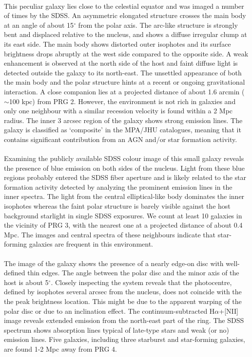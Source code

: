 \documentclass[useAMS,usenatbib]{mn2e}
\begin{document}
 \\
This peculiar galaxy lies close to the celestial equator and was imaged a number of times by the SDSS.
An asymmetric elongated structure crosses the main body at an angle of about 15$^\circ$ from the polar axis.
The arc-like structure is strongly bent and displaced relative to the nucleus, and shows a diffuse irregular clump at its east side.
The main body shows distorted outer isophotes and its surface brightness drops abruptly at the west side compared to the opposite side. 
A weak enhancement is observed at the north side of the host and faint diffuse light is detected outside the galaxy to its north-east.
The unsettled appearance of both the main body and the polar structure hints at a recent or ongoing gravitational interaction.
A close companion lies at a projected distance of about 1.6 arcmin ($\sim$100 kpc) from PRG 2.
However, the environment is not rich in galaxies and only one neighbour with a similar recession velocity is found within a 2 Mpc radius. 
The inner 3 arcsec region of the galaxy shows strong emission lines. 
The galaxy is classified as `composite' in the MPA/JHU catalogues, meaning that it contains significant contribution from an AGN and/or star formation activity.\\

 \\ 
Examining the publicly available SDSS colour image of this small galaxy reveals the presence of blue emission on both sides of the nucleus.
Light from these blue regions probably entered the SDSS fiber aperture and is likely related to the star formation activity detected by analyzing the prominent emission lines in the inner spectra.
The light from the central elliptical-like body dominates the inner isophotes whereas the faint polar structure is barely visible against the host  background starlight in single SDSS exposures.
We count at least 10 galaxies in the vicinity of PRG 3, with the nearest one at a projected distance of about 0.4 Mpc.
The images and central spectra of these neighbours indicate that star-forming galaxies are frequent in this environment.\\


 \\
The image of the galaxy shows the presence of a nearly edge-on disc with well-defined thin edges.
The angle between the polar disc and the minor axis of the host is about 5$^\circ$.
Closely inspecting the system reveals that the photocentre, defined by isophotes several arcsec from the nucleus, does not coincide with the the peak brightness location. This might be due to the apparent warping of the polar disc or due to an inclination effect.
The continuum-subtracted H$\alpha$+[NII] image reveals extended emission from the north-east part of the ring.
The SDSS spectrum shows absorption lines typical of late-type stars and weak (or no) emission lines. 
Five galaxies, including three starburst and star-forming galaxies, are found 1-2 Mpc away from PRG 4.\\
\end{document}
